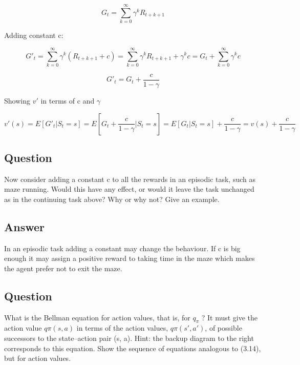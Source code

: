 \documentclass[11pt]{article}
\begin{document}
    \begin{equation}
        G_{t} = \sum_{k=0}^{\infty} \gamma^{k} R_{t+k+1}
    \end{equation}

    Adding constant c:

    \begin{equation}
        G'_{t} = \sum_{k=0}^{\infty} \gamma^{k} (R_{t+k+1} + c) = \sum_{k=0}^{\infty} \gamma^{k} R_{t+k+1} + \gamma^{k} c = G_{t} +  \sum_{k=0}^{\infty} \gamma^{k} c
    \end{equation}

    \begin{equation}
        G'_{t} =  G_{t} + \frac{c}{1-\gamma}
    \end{equation}

    Showing $v'$ in terms of c and $\gamma$

    \begin{equation}
        v'(s) =  E[G'_{t}|S_{t}=s] = E[G_{t} + \frac{c}{1-\gamma}|S_{t}=s] = E[G_{t}|S_{t}=s] + \frac{c}{1-\gamma} = v(s) + \frac{c}{1-\gamma}
    \end{equation}

    \subsection{Question}

    Now consider adding a constant c to all the rewards in an episodic task, such as maze running.
    Would this have any effect, or would it leave the task unchanged as in the continuing task above?
    Why or why not?
    Give an example.

    \subsection*{Answer}

    In an episodic task adding a constant may change the behaviour.
    If c is big enough it may assign a positive reward to taking time in the maze which makes the agent prefer not to exit the maze.

    \subsection{Question}

    What is the Bellman equation for action values, that is, for $q_\pi$ ?
    It must give the action value $q\pi(s, a)$ in terms of the action values, $q\pi(s', a')$, of possible successors to the state–action pair (s, a).
    Hint: the backup diagram to the right corresponds to this equation.
    Show the sequence of equations analogous to (3.14), but for action values.
\end{document}
